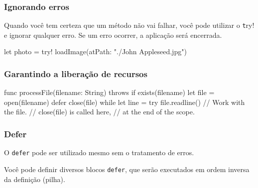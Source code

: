 \begin{frame}[fragile]
    \frametitle{Ignorando erros}

    Quando você tem certeza que um método não vai falhar, você pode
    utilizar o {\color{green} \texttt try!} e ignorar qualquer erro. Se
    um erro ocorrer, a aplicação será encerrada.
    \vspace{.7cm}
    \begin{swift}
let photo = try! loadImage(atPath: "./John Appleseed.jpg")
    \end{swift}

\end{frame}

\begin{frame}[fragile]
    \frametitle{Garantindo a liberação de recursos}
    \begin{swift}
    func processFile(filename: String) throws {
        if exists(filename) {
            let file = open(filename)
            defer {
                close(file)
            }
            while let line = try file.readline() {
                // Work with the file.
            }
            // close(file) is called here,
            // at the end of the scope.
        }
    }
    \end{swift}
\end{frame}

\begin{frame}[fragile]
    \frametitle{Defer}

    O {\color{green}\texttt{defer}} pode ser utilizado mesmo sem o
    tratamento de erros.

    \vspace{.75cm}

    Você pode definir diversos blocos {\color{green}\texttt{defer}},
    que serão executados em ordem inversa da definição (pilha).
\end{frame}


